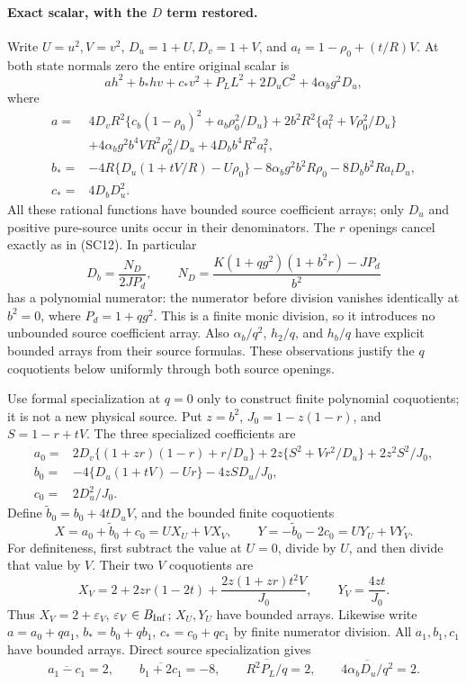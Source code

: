 \paragraph{Exact scalar, with the $D$ term restored.}
Write $U=u^2,V=v^2$, $D_u=1+U,D_v=1+V$, and
$a_t=1-\rho_0+(t/R)V$. At both state normals zero the entire original
scalar is
\[
 a h^2+b_*hv+c_*v^2+P_L L^2+2D_uC^2+4\alpha_b g^2D_u,
 \tag{QI2}
\]
where
\begin{align*}
 a={}&4D_vR^2\{c_b(1-\rho_0)^2+a_b\rho_0^2/D_u\}
 +2b^2R^2\{a_t^2+V\rho_0^2/D_u\}\\
 &+4\alpha_b g^2b^4VR^2\rho_0^2/D_u
 +4D_bb^4R^2a_t^2,\\
 b_*={}&-4R\{D_u(1+tV/R)-U\rho_0\}
 -8\alpha_b g^2b^2R\rho_0-8D_bb^2Ra_tD_u,\\
 c_*={}&4D_bD_u^2.
\end{align*}
All these rational functions have bounded source coefficient arrays;
only $D_u$ and positive pure-source units occur in their denominators.
The $r$ openings cancel exactly as in (SC12).
In particular
\[
 D_b=\frac{N_D}{2JP_d},\qquad
 N_D=\frac{K(1+qg^2)(1+b^2r)-JP_d}{b^2}
\]
has a polynomial numerator: the numerator before division vanishes
identically at $b^2=0$, where $P_d=1+qg^2$. This is a finite monic
division, so it introduces no unbounded source coefficient array.
Also $\alpha_b/q^2$, $h_2/q$, and $h_b/q$ have explicit bounded
arrays from their source formulas. These observations justify the
$q$ coquotients below uniformly through both source openings.

Use formal specialization at $q=0$ only to construct finite polynomial
coquotients; it is not a new physical source. Put $z=b^2$,
$J_0=1-z(1-r)$, and $S=1-r+tV$. The three specialized coefficients are
\begin{align*}
 a_0={}&2D_v\{(1+zr)(1-r)+r/D_u\}
       +2z\{S^2+Vr^2/D_u\}+2z^2S^2/J_0,\\
 b_0={}&-4\{D_u(1+tV)-Ur\}-4zSD_u/J_0,\\
 c_0={}&2D_u^2/J_0.
\end{align*}
Define $\widetilde b_0=b_0+4tD_uV$, and the bounded finite
coquotients
\[
 X=a_0+\widetilde b_0+c_0=U X_U+V X_V,
 \qquad Y=-\widetilde b_0-2c_0=U Y_U+V Y_V.
 \tag{QI3}
\]
For definiteness, first subtract the value at $U=0$, divide by $U$,
and then divide that value by $V$. Their two $V$ coquotients are
\[
 X_V=2+2zr(1-2t)+\frac{2z(1+zr)t^2V}{J_0},
 \qquad Y_V=\frac{4zt}{J_0}.
 \tag{QI4}
\]
Thus $X_V=2+\varepsilon_V$, $\varepsilon_V\in B_{\rm Inf}$;
$X_U,Y_U$ have bounded arrays. Likewise write
$a=a_0+qa_1$, $b_*=b_0+qb_1$, $c_*=c_0+qc_1$ by finite numerator
division. All $a_1,b_1,c_1$ have bounded arrays. Direct source
specialization gives
\[
 \overline{a_1-c_1}=2,\qquad
 \overline{b_1+2c_1}=-8,\qquad
 \overline{R^2P_L/q}=2,\qquad
 \overline{4\alpha_bD_u/q^2}=2.
 \tag{QI5}
\]

